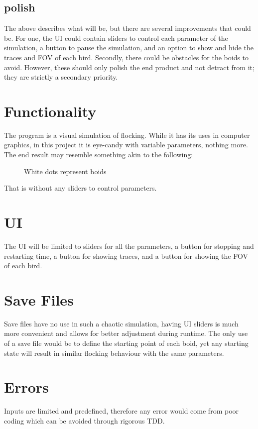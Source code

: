 \documentclass{article}
\begin{document}
\subsection{polish}

The above describes what will be, but there are several improvements that could be. For one, the UI could contain sliders to control each parameter of the simulation, a button to pause the simulation, and an option to show and hide the traces and FOV of each bird. Secondly, there could be obstacles for the boids to avoid. However, these should only polish the end product and not detract from it; they are strictly a secondary priority.   

\section{Functionality}
The program is a visual simulation of flocking. While it has its uses in computer graphics, in this project it is eye-candy with variable parameters, nothing more. The end result may resemble something akin to the following:
\vspace{2ex}
\begin{figure}[H]
    \centering
    \setlength{\fboxsep}{0.7pt}
    \setlength{\fboxrule}{3pt}
    \caption{White dots represent boids}
\end{figure}
\vspace{2ex}
That is without any sliders to control parameters.
\section{UI}
The UI will be limited to sliders for all the parameters, a button for stopping and restarting time, a button for showing traces, and a button for showing the FOV of each bird.
\section{Save Files}
Save files have no use in such a chaotic simulation, having UI sliders is much more convenient and allows for better adjustment during runtime. The only use of a save file would be to define the starting point of each boid, yet any starting state will result in similar flocking behaviour with the same parameters. 
\section{Errors}
Inputs are limited and predefined, therefore any error would come from poor coding which can be avoided through rigorous TDD.
\end{document}
